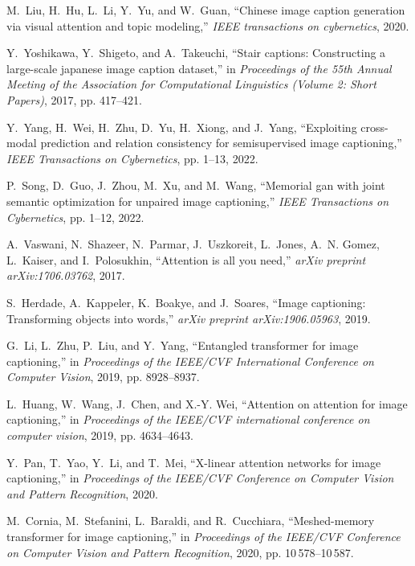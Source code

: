 \documentclass[journal]{IEEEtran}
\begin{document}
\begin{thebibliography}{10}
M.~Liu, H.~Hu, L.~Li, Y.~Yu, and W.~Guan, ``Chinese image caption generation
  via visual attention and topic modeling,'' \emph{IEEE transactions on
  cybernetics}, 2020.

Y.~Yoshikawa, Y.~Shigeto, and A.~Takeuchi, ``Stair captions: Constructing a
  large-scale japanese image caption dataset,'' in \emph{Proceedings of the
  55th Annual Meeting of the Association for Computational Linguistics (Volume
  2: Short Papers)}, 2017, pp. 417--421.

Y.~Yang, H.~Wei, H.~Zhu, D.~Yu, H.~Xiong, and J.~Yang, ``Exploiting cross-modal
  prediction and relation consistency for semisupervised image captioning,''
  \emph{IEEE Transactions on Cybernetics}, pp. 1--13, 2022.

P.~Song, D.~Guo, J.~Zhou, M.~Xu, and M.~Wang, ``Memorial gan with joint
  semantic optimization for unpaired image captioning,'' \emph{IEEE
  Transactions on Cybernetics}, pp. 1--12, 2022.

A.~Vaswani, N.~Shazeer, N.~Parmar, J.~Uszkoreit, L.~Jones, A.~N. Gomez,
  L.~Kaiser, and I.~Polosukhin, ``Attention is all you need,'' \emph{arXiv
  preprint arXiv:1706.03762}, 2017.

S.~Herdade, A.~Kappeler, K.~Boakye, and J.~Soares, ``Image captioning:
  Transforming objects into words,'' \emph{arXiv preprint arXiv:1906.05963},
  2019.

G.~Li, L.~Zhu, P.~Liu, and Y.~Yang, ``Entangled transformer for image
  captioning,'' in \emph{Proceedings of the IEEE/CVF International Conference
  on Computer Vision}, 2019, pp. 8928--8937.

L.~Huang, W.~Wang, J.~Chen, and X.-Y. Wei, ``Attention on attention for image
  captioning,'' in \emph{Proceedings of the IEEE/CVF international conference
  on computer vision}, 2019, pp. 4634--4643.

Y.~Pan, T.~Yao, Y.~Li, and T.~Mei, ``X-linear attention networks for image
  captioning,'' in \emph{Proceedings of the IEEE/CVF Conference on Computer
  Vision and Pattern Recognition}, 2020.

M.~Cornia, M.~Stefanini, L.~Baraldi, and R.~Cucchiara, ``Meshed-memory
  transformer for image captioning,'' in \emph{Proceedings of the IEEE/CVF
  Conference on Computer Vision and Pattern Recognition}, 2020, pp.
  10\,578--10\,587.


\end{thebibliography}
\end{document}
